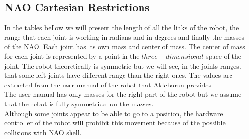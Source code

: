 \subsection{NAO Cartesian Restrictions}
In the tables bellow we will present the length of all the links of the robot, the range that each joint is working in radians and in degrees and finally the masses of the NAO. Each joint has its own mass and center of mass. The center of mass for each joint is represented by a point in the \(three-dimensional\) space of the joint. The robot theoretically is symmetric but we will see, in the joints ranges, that some left joints have different range than the right ones. The values are extracted from the user manual of the robot that Aldebaran provides.\\
The user manual has only masses for the right part of the robot but we assume that the robot is fully symmetrical on the masses.\\
Although some joints appear to be able to go to a position, the hardware controller of the robot will prohibit this movement because of the possible collisions with NAO shell.


